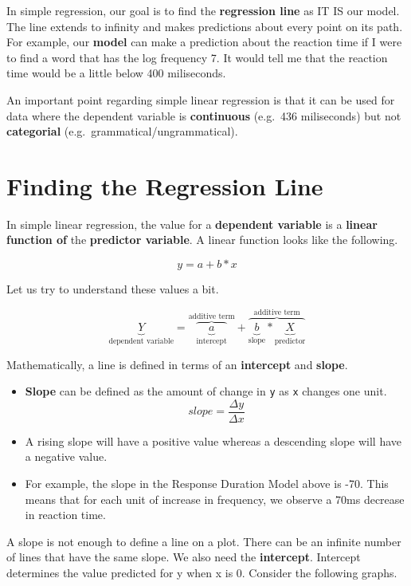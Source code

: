 \documentclass[
]{book}
\providecommand{\tightlist}{%
  \setlength{\itemsep}{0pt}\setlength{\parskip}{0pt}}
\begin{document}
In simple regression, our goal is to find the \textbf{regression line} as IT IS our model. The line extends to infinity and makes predictions about every point on its path. For example, our \textbf{model} can make a prediction about the reaction time if I were to find a word that has the log frequency 7. It would tell me that the reaction time would be a little below 400 miliseconds.

An important point regarding simple linear regression is that it can be used for data where the dependent variable is \textbf{continuous} (e.g.~436 miliseconds) but not \textbf{categorial} (e.g.~grammatical/ungrammatical).

\section{Finding the Regression Line}\label{finding-the-regression-line}

In simple linear regression, the value for a \textbf{dependent variable} is a \textbf{linear function of} the \textbf{predictor variable}. A linear function looks like the following.

\[y = a + b * x\]

Let us try to understand these values a bit.

\[ \underbrace{Y}_{\text{dependent variable}} =
            \overbrace{\underbrace{a}_{\text{intercept}}}^{\text{additive term}} + 
            \overbrace{\underbrace{b}_{\text{slope}} * \underbrace{X}_{\text{predictor}}}^{\text{additive term}} \]

Mathematically, a line is defined in terms of an \textbf{intercept} and \textbf{slope}.

\begin{itemize}
\tightlist
\item
  \textbf{Slope} can be defined as the amount of change in \texttt{y} as \texttt{x} changes one unit.
  \[ slope = \frac{\Delta y}{\Delta x}  \]
\item
  A rising slope will have a positive value whereas a descending slope will have a negative value.
\item
  For example, the slope in the Response Duration Model above is -70. This means that for each unit of increase in frequency, we observe a 70ms decrease in reaction time.
\end{itemize}

A slope is not enough to define a line on a plot. There can be an infinite number of lines that have the same slope. We also need the \textbf{intercept}. Intercept determines the value predicted for y when x is 0. Consider the following graphs.
\end{document}
